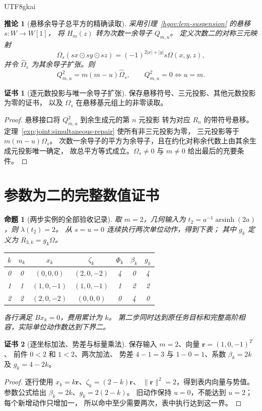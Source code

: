\documentclass[12pt,a4paper,openany,notitlepage]{report}
\theoremstyle{plain}
\newtheorem{proposition}[theorem]{命题}
\newtheorem{corollary}[theorem]{推论}
\theoremstyle{definition}
\newtheorem*{certificate}{证书}
\theoremstyle{remark}
\def\mathcal#1{#1}\def\mathsf#1{#1}\def\mathbb#1{#1}%
\begin{document}
\begin{CJK*}{UTF8}{gkai}
\begin{corollary}[悬移余导子总平方的精确读取]
\label{exp:joint:coderivation-square}
采用引理~\ref{hgov:lem-suspension} 的悬移 $s:W\to W[1]$，
将 $H_m(z)$ 转为次数一余导子 $Q_{m,u}$。
定义次数二的对称三元映射
\[
 \Omega_s(sx\odot sy\odot sz)
 =(-1)^{2|x|+|y|}s\Omega(x,y,z),
\]
并令 $\widehat\Omega_s$ 为其余导子扩张。则
\[
 Q_{m,u}^{2}=m(m-u)\widehat\Omega_s,
 \qquad Q_{m,u}^{2}=0\Longleftrightarrow u=m.
\]
\end{corollary}
\begin{certificate}[逐元数投影与唯一余导子扩张]
保存悬移符号、三元投影、其他元数投影为零的证书，
以及 $\Omega_s$ 在悬移基元组上的非零读取。
\end{certificate}
\begin{proof}
悬移接口将 $Q_{m,u}^2$ 到余生成元的第 $n$ 元投影
转为对应 $\mathcal R_n$ 的带符号悬移。
定理~\ref{exp:joint:simultaneous-repair} 使所有非三元投影为零，
三元投影等于 $m(m-u)\Omega_s$。
次数一余导子的平方为余导子，且在约化对称余代数上由其余生成元投影唯一确定，
故总平方等式成立。$\Omega_s\ne0$ 与 $m\ne0$ 给出最后的充要条件。
\end{proof}

\section{参数为二的完整数值证书}

\begin{proposition}[两步实例的全部验收记录]
\label{exp:joint:m-two}
取 $m=2$，几何输入为
$t_2=a^{-1}\operatorname{arsinh}(2a)$，则 $\lambda(t_2)=2$。
从 $s=u=0$ 连续执行两次单位动作，得到下表；
其中 $g_k$ 定义为 $\mathcal R_{3,k}=g_k\Omega$。
\begin{center}
\begin{tabular}{ccccccc}
\toprule
$k$ & $u_k$ & $x_k$ & $\zeta_k$ & $\Phi_k$ & $\beta_k$ & $g_k$\\
\midrule
0 & 0 & $(0,0,0)$ & $(2,0,-2)$ & 4 & 0 & 4\\
1 & 1 & $(1,0,-1)$ & $(1,0,-1)$ & 1 & 2 & 2\\
2 & 2 & $(2,0,-2)$ & $(0,0,0)$ & 0 & 4 & 0\\
\bottomrule
\end{tabular}
\end{center}
各行满足 $Bx_k=0$，费用累计为 $k$。
第二步同时达到原任务目标和完整高阶相容，实际单位动作数达到下界二。
\end{proposition}
\begin{certificate}[逐坐标加法、势差与标量乘法]
保存输入 $m=2$、向量 $\mathbf r=(1,0,-1)^{\mathsf T}$、
前件 $0<2$ 和 $1<2$、两次加法、
势差 $4-1=3$ 与 $1-0=1$、系数 $\beta_k=2k$ 及
$g_k=4-2k$。
\end{certificate}
\begin{proof}
逐行使用 $x_k=k\mathbf r$、$\zeta_k=(2-k)\mathbf r$、
$\|\mathbf r\|^2=2$，得到表内向量与势值。
参数公式给出 $\beta_k=2k$、$g_k=2(2-k)$。
旧动作保持 $u=0$，不能达到 $u=2$；每个新增动作只增加一，
所以命中至少需要两次，表中执行达到这一界。
\end{proof}


\end{CJK*}
\end{document}
